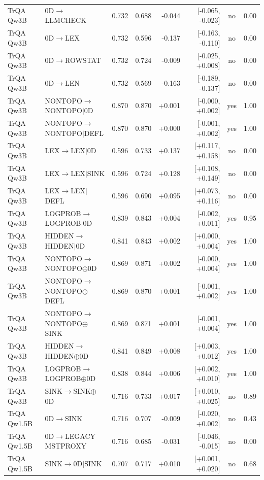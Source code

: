 \begin{longtable}{llrrrrcc}
TrQA Qw3B & 0D$\to$LLMCHECK & 0.732 & 0.688 & -0.044 & [-0.065, -0.023] & no & 0.00 \\
TrQA Qw3B & 0D$\to$LEX & 0.732 & 0.596 & -0.137 & [-0.163, -0.110] & no & 0.00 \\
TrQA Qw3B & 0D$\to$ROWSTAT & 0.732 & 0.724 & -0.009 & [-0.025, +0.008] & no & 0.00 \\
TrQA Qw3B & 0D$\to$LEN & 0.732 & 0.569 & -0.163 & [-0.189, -0.137] & no & 0.00 \\
TrQA Qw3B & NONTOPO$\to$NONTOPO$\mid$0D & 0.870 & 0.870 & +0.001 & [-0.000, +0.002] & yes & 1.00 \\
TrQA Qw3B & NONTOPO$\to$NONTOPO$\mid$DEFL & 0.870 & 0.870 & +0.000 & [-0.001, +0.002] & yes & 1.00 \\
TrQA Qw3B & LEX$\to$LEX$\mid$0D & 0.596 & 0.733 & +0.137 & [+0.117, +0.158] & no & 0.00 \\
TrQA Qw3B & LEX$\to$LEX$\mid$SINK & 0.596 & 0.724 & +0.128 & [+0.108, +0.149] & no & 0.00 \\
TrQA Qw3B & LEX$\to$LEX$\mid$DEFL & 0.596 & 0.690 & +0.095 & [+0.073, +0.116] & no & 0.00 \\
TrQA Qw3B & LOGPROB$\to$LOGPROB$\mid$0D & 0.839 & 0.843 & +0.004 & [-0.002, +0.011] & yes & 0.95 \\
TrQA Qw3B & HIDDEN$\to$HIDDEN$\mid$0D & 0.841 & 0.843 & +0.002 & [+0.000, +0.004] & yes & 1.00 \\
TrQA Qw3B & NONTOPO$\to$NONTOPO$\oplus$0D & 0.869 & 0.871 & +0.002 & [-0.000, +0.004] & yes & 1.00 \\
TrQA Qw3B & NONTOPO$\to$NONTOPO$\oplus$DEFL & 0.869 & 0.870 & +0.001 & [-0.001, +0.002] & yes & 1.00 \\
TrQA Qw3B & NONTOPO$\to$NONTOPO$\oplus$SINK & 0.869 & 0.871 & +0.001 & [-0.001, +0.004] & yes & 1.00 \\
TrQA Qw3B & HIDDEN$\to$HIDDEN$\oplus$0D & 0.841 & 0.849 & +0.008 & [+0.003, +0.012] & yes & 1.00 \\
TrQA Qw3B & LOGPROB$\to$LOGPROB$\oplus$0D & 0.838 & 0.844 & +0.006 & [+0.002, +0.010] & yes & 1.00 \\
TrQA Qw3B & SINK$\to$SINK$\oplus$0D & 0.716 & 0.733 & +0.017 & [+0.010, +0.025] & no & 0.89 \\
TrQA Qw1.5B & 0D$\to$SINK & 0.716 & 0.707 & -0.009 & [-0.020, +0.002] & no & 0.43 \\
TrQA Qw1.5B & 0D$\to$LEGACY MSTPROXY & 0.716 & 0.685 & -0.031 & [-0.046, -0.015] & no & 0.00 \\
TrQA Qw1.5B & SINK$\to$0D$\mid$SINK & 0.707 & 0.717 & +0.010 & [+0.001, +0.020] & no & 0.68 \\

\end{longtable}
